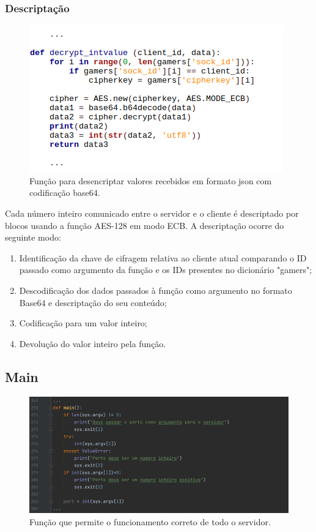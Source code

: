 \documentclass{report}
\begin{document}
\subsubsection{Descriptação}
\begin{figure}[H]
        \centering
        \includegraphics[scale=0.65]{decrypt_intvalue}  
        \caption{Função para desencriptar valores recebidos em formato json com codificação base64.}
\end{figure}
Cada número inteiro comunicado entre o servidor e o cliente é descriptado por blocos usando a função AES-128 em modo ECB. A descriptação ocorre do seguinte modo:
\begin{enumerate}
\item Identificação da chave de cifragem relativa ao cliente atual comparando o ID passado como argumento da função e os IDs presentes no dicionário "gamers";
\item Descodificação dos dados passados à função como argumento no formato Base64 e descriptação do seu conteúdo;
\item Codificação para um valor inteiro;
\item Devolução do valor inteiro pela função.
\end{enumerate}

\subsection{Main}
\begin{figure}[H]
        \centering
        \includegraphics[scale=0.20]{serverMain}      
        \caption{Função que permite o funcionamento correto de todo o servidor.}
\end{figure}
\end{document}
